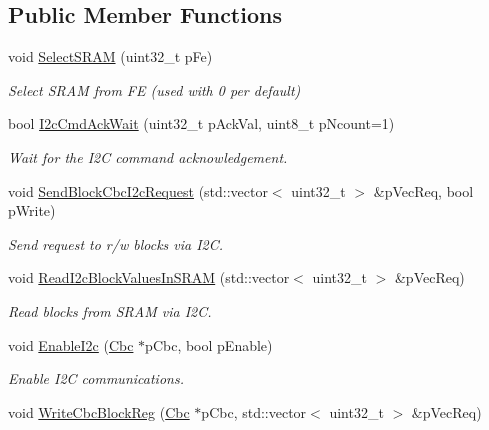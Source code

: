 \subsection*{Public Member Functions}
\begin{DoxyCompactItemize}
\item 
void \hyperlink{class_ph2___hw_interface_1_1_cbc_interface_a628bbb6c24aa40a7d1a6bc7e9585790e}{Select\-S\-R\-A\-M} (uint32\-\_\-t p\-Fe)
\begin{DoxyCompactList}\small\item\em Select S\-R\-A\-M from F\-E (used with 0 per default) \end{DoxyCompactList}\item 
bool \hyperlink{class_ph2___hw_interface_1_1_cbc_interface_ad171e07d3777cebcdd1f65cc03915e7b}{I2c\-Cmd\-Ack\-Wait} (uint32\-\_\-t p\-Ack\-Val, uint8\-\_\-t p\-Ncount=1)
\begin{DoxyCompactList}\small\item\em Wait for the I2\-C command acknowledgement. \end{DoxyCompactList}\item 
void \hyperlink{class_ph2___hw_interface_1_1_cbc_interface_a89fb26e8441039ffa635ce189ab034be}{Send\-Block\-Cbc\-I2c\-Request} (std\-::vector$<$ uint32\-\_\-t $>$ \&p\-Vec\-Req, bool p\-Write)
\begin{DoxyCompactList}\small\item\em Send request to r/w blocks via I2\-C. \end{DoxyCompactList}\item 
void \hyperlink{class_ph2___hw_interface_1_1_cbc_interface_a5bffbf2ff373386ed92f8823ebe2cef3}{Read\-I2c\-Block\-Values\-In\-S\-R\-A\-M} (std\-::vector$<$ uint32\-\_\-t $>$ \&p\-Vec\-Req)
\begin{DoxyCompactList}\small\item\em Read blocks from S\-R\-A\-M via I2\-C. \end{DoxyCompactList}\item 
void \hyperlink{class_ph2___hw_interface_1_1_cbc_interface_a03c443239c9ee90a9d547fbcfed89df4}{Enable\-I2c} (\hyperlink{class_ph2___hw_description_1_1_cbc}{Cbc} $\ast$p\-Cbc, bool p\-Enable)
\begin{DoxyCompactList}\small\item\em Enable I2\-C communications. \end{DoxyCompactList}\item 
void \hyperlink{class_ph2___hw_interface_1_1_cbc_interface_a0829d7f94889de251860cae3f5f9d565}{Write\-Cbc\-Block\-Reg} (\hyperlink{class_ph2___hw_description_1_1_cbc}{Cbc} $\ast$p\-Cbc, std\-::vector$<$ uint32\-\_\-t $>$ \&p\-Vec\-Req)

\end{DoxyCompactItemize}
